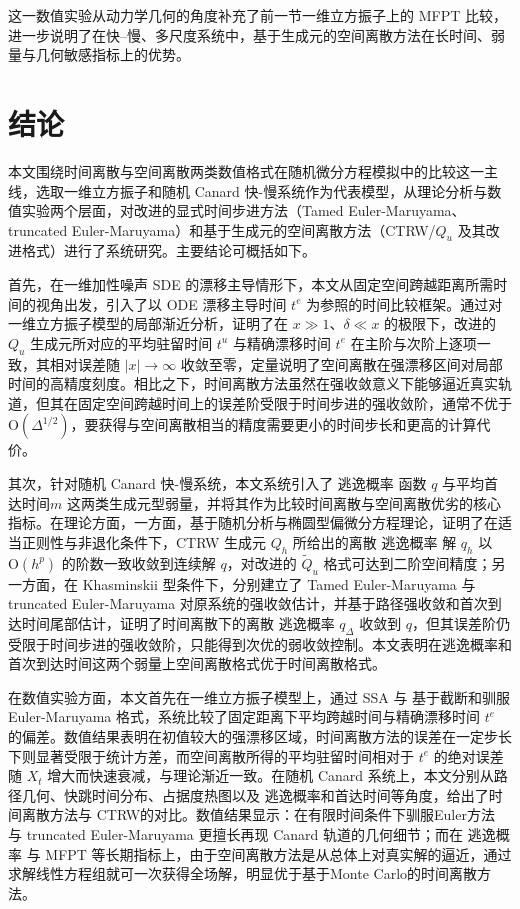 这一数值实验从动力学几何的角度补充了前一节一维立方振子上的 MFPT 比较，进一步说明了在快--慢、多尺度系统中，基于生成元的空间离散方法在长时间、弱量与几何敏感指标上的优势。



\section{结论}

本文围绕时间离散与空间离散两类数值格式在随机微分方程模拟中的比较这一主线，选取一维立方振子和随机 Canard 快-慢系统作为代表模型，从理论分析与数值实验两个层面，对改进的显式时间步进方法（Tamed Euler-Maruyama、truncated Euler-Maruyama）和基于生成元的空间离散方法（CTRW/\(Q_u\) 及其改进格式）进行了系统研究。主要结论可概括如下。

首先，在一维加性噪声 SDE 的漂移主导情形下，本文从固定空间跨越距离所需时间的视角出发，引入了以 ODE 漂移主导时间 \(t^e\) 为参照的时间比较框架。通过对一维立方振子模型的局部渐近分析，证明了在 \(x\gg 1\)、\(\delta\ll x\) 的极限下，改进的 \(Q_u\) 生成元所对应的平均驻留时间 \(t^u\) 与精确漂移时间 \(t^e\) 在主阶与次阶上逐项一致，其相对误差随 \(|x|\to\infty\) 收敛至零，定量说明了空间离散在强漂移区间对局部时间的高精度刻度。相比之下，时间离散方法虽然在强收敛意义下能够逼近真实轨道，但其在固定空间跨越时间上的误差阶受限于时间步进的强收敛阶，通常不优于 \(\mathrm{O}(\Delta^{1/2})\)，要获得与空间离散相当的精度需要更小的时间步长和更高的计算代价。

其次，针对随机 Canard 快-慢系统，本文系统引入了 逃逸概率 函数 \(q\) 与平均首达时间\(m\) 这两类生成元型弱量，并将其作为比较时间离散与空间离散优劣的核心指标。在理论方面，一方面，基于随机分析与椭圆型偏微分方程理论，证明了在适当正则性与非退化条件下，CTRW 生成元 \(Q_h\) 所给出的离散 逃逸概率 解 \(q_h\) 以 \(\mathrm{O}(h^p)\) 的阶数一致收敛到连续解 \(q\)，对改进的 \(\widetilde Q_u\) 格式可达到二阶空间精度；另一方面，在 Khasminskii 型条件下，分别建立了 Tamed Euler-Maruyama 与 truncated Euler-Maruyama 对原系统的强收敛估计，并基于路径强收敛和首次到达时间尾部估计，证明了时间离散下的离散 逃逸概率 \(q_\Delta\) 收敛到 \(q\)，但其误差阶仍受限于时间步进的强收敛阶，只能得到次优的弱收敛控制。本文表明在逃逸概率和首次到达时间这两个弱量上空间离散格式优于时间离散格式。

在数值实验方面，本文首先在一维立方振子模型上，通过 SSA 与 基于截断和驯服 Euler-Maruyama 格式，系统比较了固定距离下平均跨越时间与精确漂移时间 \(t^e\) 的偏差。数值结果表明在初值较大的强漂移区域，时间离散方法的误差在一定步长下则显著受限于统计方差，而空间离散所得的平均驻留时间相对于 \(t^e\) 的绝对误差随 \(X_t\) 增大而快速衰减，与理论渐近一致。在随机 Canard 系统上，本文分别从路径几何、快跳时间分布、占据度热图以及 逃逸概率和首达时间等角度，给出了时间离散方法与 CTRW的对比。数值结果显示：在有限时间条件下驯服Euler方法 与 truncated Euler-Maruyama 更擅长再现 Canard 轨道的几何细节；而在 逃逸概率 与 MFPT 等长期指标上，由于空间离散方法是从总体上对真实解的逼近，通过求解线性方程组就可一次获得全场解，明显优于基于Monte Carlo的时间离散方法。

